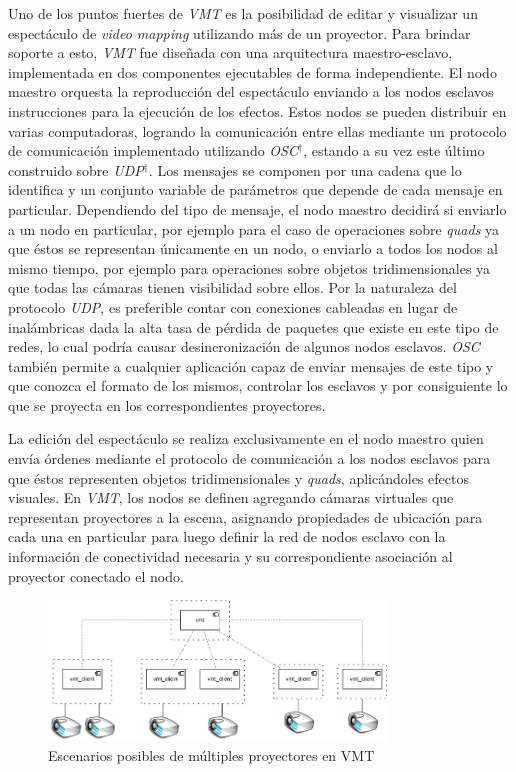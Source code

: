 Uno de los puntos fuertes de \emph{VMT} es la posibilidad de editar y visualizar un espectáculo de \emph{video mapping} utilizando más de un proyector.
Para brindar soporte a esto, \emph{VMT} fue diseñada con una arquitectura maestro-esclavo, implementada en dos componentes ejecutables de forma independiente.
El nodo maestro orquesta la reproducción del espectáculo enviando a los nodos esclavos instrucciones para la ejecución de los efectos. Estos nodos se pueden distribuir en varias computadoras, logrando la comunicación entre ellas mediante un protocolo de comunicación implementado utilizando \emph{OSC}$^\dagger$, estando a su vez este último construido sobre \emph{UDP}$^\dagger$.
Los mensajes se componen por una cadena que lo identifica y un conjunto variable de parámetros que depende de cada mensaje en particular.
Dependiendo del tipo de mensaje, el nodo maestro decidirá si enviarlo a un nodo en particular, por ejemplo para el caso de operaciones sobre \emph{quads} ya que éstos se representan únicamente en un nodo, o enviarlo a todos los nodos al mismo tiempo, por ejemplo para operaciones sobre objetos tridimensionales ya que todas las cámaras tienen visibilidad sobre ellos.
Por la naturaleza del protocolo \emph{UDP}, es preferible contar con conexiones cableadas en lugar de inalámbricas dada la alta tasa de pérdida de paquetes que existe en este tipo de redes, lo cual podría causar desincronización de algunos nodos esclavos. \emph{OSC} también permite a cualquier aplicación capaz de enviar mensajes de este tipo y que conozca el formato de los mismos, controlar los esclavos y por consiguiente lo que se proyecta en los correspondientes proyectores.

La edición del espectáculo se realiza exclusivamente en el nodo maestro quien envía órdenes mediante el protocolo de comunicación a los nodos esclavos para que éstos representen objetos tridimensionales y \emph{quads}, aplicándoles efectos visuales.
En \emph{VMT}, los nodos se definen agregando cámaras virtuales que representan proyectores a la escena, asignando propiedades de ubicación para cada una en particular para luego definir la red de nodos esclavo con la información de conectividad necesaria y su correspondiente asociación al proyector conectado el nodo.

\begin{figure}[H]
  \centering
    \includegraphics[width=0.8\textwidth]{./Cap5_vmt/vmt_multiProjector.png}
  \caption[Imagen propia.]{Escenarios posibles de múltiples proyectores en VMT}
  \label{fig:VMT-MultiProjector}
\end{figure}

